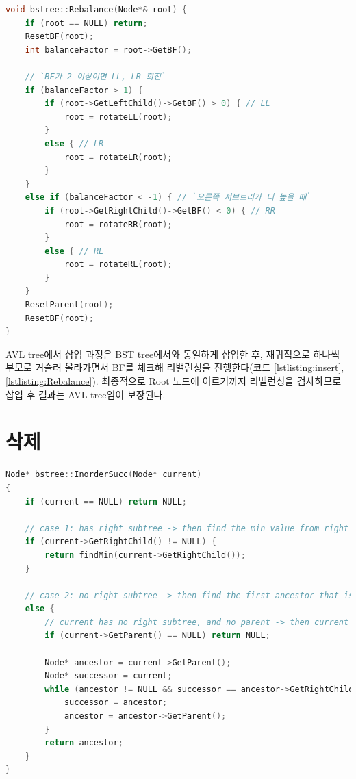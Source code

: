 \documentclass{article}
\begin{document}
\begin{lstlisting}[language=C++, escapeinside=``, caption=Rebalance, label={lstlisting:Rebalance}]
void bstree::Rebalance(Node*& root) {
	if (root == NULL) return;
	ResetBF(root);
	int balanceFactor = root->GetBF();

	// `BF가 2 이상이면 LL, LR 회전`
	if (balanceFactor > 1) {
		if (root->GetLeftChild()->GetBF() > 0) { // LL
			root = rotateLL(root);
		}
		else { // LR
			root = rotateLR(root);
		}
	}
	else if (balanceFactor < -1) { // `오른쪽 서브트리가 더 높을 때`
		if (root->GetRightChild()->GetBF() < 0) { // RR
			root = rotateRR(root);
		}
		else { // RL
			root = rotateRL(root);
		}
	}
	ResetParent(root);
	ResetBF(root);
}
\end{lstlisting}
AVL tree에서 삽입 과정은 BST tree에서와 동일하게 삽입한 후, 재귀적으로 하나씩 부모로 거슬러 올라가면서 BF를 체크해 리밸런싱을 진행한다(코드 \ref{lstlisting:insert}, \ref{lstlisting:Rebalance}). 최종적으로 Root 노드에 이르기까지 리밸런싱을 검사하므로 삽입 후 결과는 AVL tree임이 보장된다.

\section{삭제}
\begin{lstlisting}[language=C++, escapeinside=``, caption=InorderSuccessor, label={lstlisting:successor}]
Node* bstree::InorderSucc(Node* current)
{
	if (current == NULL) return NULL;

	// case 1: has right subtree -> then find the min value from right subtree
	if (current->GetRightChild() != NULL) {
		return findMin(current->GetRightChild());
	}
	 
	// case 2: no right subtree -> then find the first ancestor that is greater than current node
	else {
		// current has no right subtree, and no parent -> then current is the root node
		if (current->GetParent() == NULL) return NULL;
		
		Node* ancestor = current->GetParent();
		Node* successor = current;
		while (ancestor != NULL && successor == ancestor->GetRightChild()) {
			successor = ancestor;
			ancestor = ancestor->GetParent();
		}
		return ancestor;
	}
}
\end{lstlisting}
\end{document}
